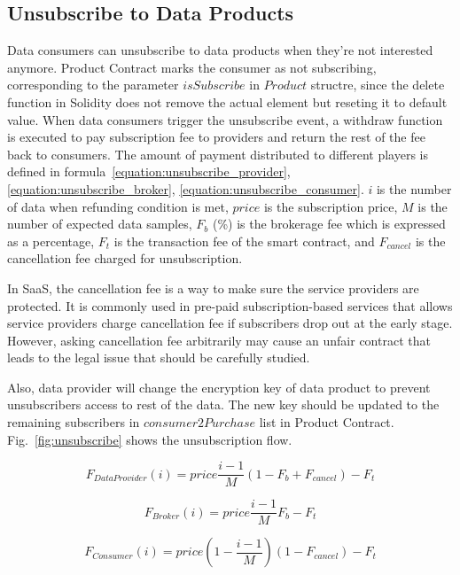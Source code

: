 \documentclass[conference]{IEEEtran}
\begin{document}
\subsection{Unsubscribe to Data Products}
Data consumers can unsubscribe to data products when they're not interested anymore. Product Contract marks the consumer as not subscribing, corresponding to the parameter $isSubscribe$ in $Product$ structre, since the delete function in Solidity does not remove the actual element but reseting it to default value. When data consumers trigger the unsubscribe event, a withdraw function is executed to pay subscription fee to providers and return the rest of the fee back to consumers. The amount of payment distributed to different players is defined in formula~\ref{equation:unsubscribe_provider}, \ref{equation:unsubscribe_broker}, \ref{equation:unsubscribe_consumer}. $i$ is the number of data when refunding condition is met, $price$  is the subscription price, $M$ is the number of expected data samples, $F_{b}$ (\%) is the brokerage fee which is expressed as a percentage, $F_{t}$ is the transaction fee of the smart contract, and $F_{cancel}$ is the cancellation fee charged for unsubscription. 

In SaaS, the cancellation fee is a way to make sure the service providers are protected. It is commonly used in pre-paid subscription-based services that allows service providers charge cancellation fee if subscribers drop out at the early stage. However, asking cancellation fee arbitrarily may cause an unfair contract that leads to the legal issue that should be carefully studied.

Also, data provider will change the encryption key of data product to prevent unsubscribers access to rest of the data. The new key should be updated to the remaining subscribers in $consumer2Purchase$ list in Product Contract. Fig.~\ref{fig:unsubscribe} shows the unsubscription flow.

\begin{equation}
\label{equation:unsubscribe_provider}
    F_{DataProvider}(i) = price \frac{i-1}{M} (1-F_{b}+F_{cancel}) -F_{t} 
\end{equation}

\begin{equation}
\label{equation:unsubscribe_broker}
    F_{Broker}(i) = price \frac{i-1}{M} F_{b} -F_{t}
\end{equation}

\begin{equation}
\label{equation:unsubscribe_consumer}
    F_{Consumer}(i) = price (1-\frac{i-1}{M})(1 -F_{cancel}) -F_{t}
\end{equation}
\end{document}
